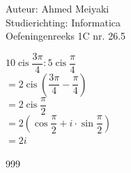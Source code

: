 \documentclass[a4paper]{article}
\begin{document}
  
\noindent \large Auteur: Ahmed Meiyaki \\
\noindent \large Studierichting: Informatica\\
\noindent \large Oefeningenreeks 1C nr. 26.5\\

\medskip

\normalsize

$10 \operatorname{cis} \dfrac{3\pi}{4} : 5 \operatorname{cis} \dfrac{\pi}{4} $  \\

$= 2 \operatorname{cis} \left(\dfrac{3\pi}{4} - \dfrac{\pi}{4}\right) $ \\

$= 2 \operatorname{cis} \dfrac{ \pi}{2} $ \\

$= 2 \left(\cos \dfrac{\pi}{2} + i \cdot \sin \dfrac{\pi}{2} \right) $ \\

$= 2i $ \\

\begin{thebibliography}{999}
\end{thebibliography}
\end{document}
